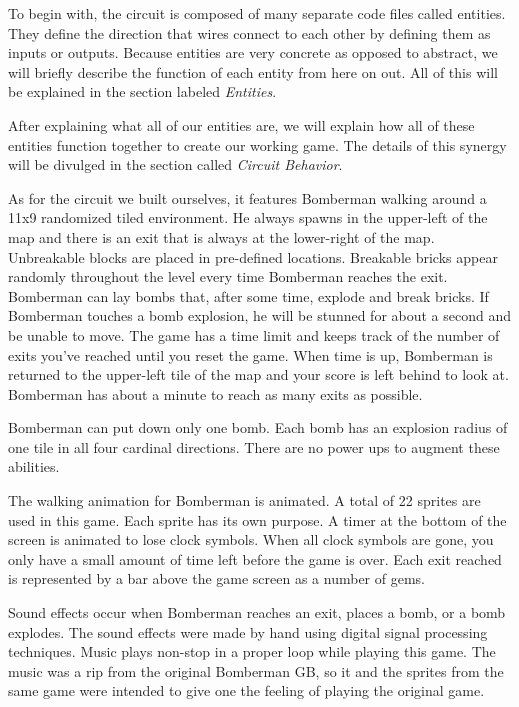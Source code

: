 \documentclass[10pt,a4paper]{article}
\begin{document}
To begin with, the circuit is composed of many separate code files called entities. They define the direction that wires connect to each other by defining them as inputs or outputs. Because entities are very concrete as opposed to abstract, we will briefly describe the function of each entity from here on out. All of this will be explained in the section labeled \emph{Entities}.

After explaining what all of our entities are, we will explain how all of these entities function together to create our working game. The details of this synergy will be divulged in the section called \emph{Circuit Behavior}.

As for the circuit we built ourselves, it features Bomberman walking around a 11x9 randomized tiled environment. He always spawns in the upper-left of the map and there is an exit that is always at the lower-right of the map. Unbreakable blocks are placed in pre-defined locations. Breakable bricks appear randomly throughout the level every time Bomberman reaches the exit. Bomberman can lay bombs that, after some time, explode and break bricks. If Bomberman touches a bomb explosion, he will be stunned for about a second and be unable to move. The game has a time limit and keeps track of the number of exits you've reached until you reset the game. When time is up, Bomberman is returned to the upper-left tile of the map and your score is left behind to look at. Bomberman has about a minute to reach as many exits as possible.

Bomberman can put down only one bomb. Each bomb has an explosion radius of one tile in all four cardinal directions. There are no power ups to augment these abilities.

The walking animation for Bomberman is animated. A total of 22 sprites are used in this game. Each sprite has its own purpose. A timer at the bottom of the screen is animated to lose clock symbols. When all clock symbols are gone, you only have a small amount of time left before the game is over. Each exit reached is represented by a bar above the game screen as a number of gems.

Sound effects occur when Bomberman reaches an exit, places a bomb, or a bomb explodes. The sound effects were made by hand using digital signal processing techniques. Music plays non-stop in a proper loop while playing this game. The music was a rip from the original Bomberman GB, so it and the sprites from the same game were intended to give one the feeling of playing the original game.
\end{document}
